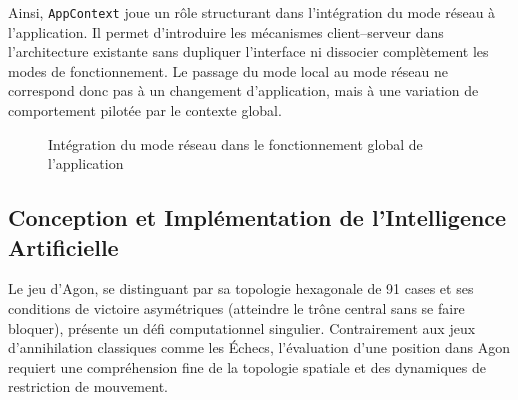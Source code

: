 \documentclass[a4paper]{article}
\begin{document}
Ainsi, \texttt{AppContext} joue un rôle structurant dans l’intégration du mode réseau à l’application. Il permet d’introduire les mécanismes client--serveur dans l’architecture existante sans dupliquer l’interface ni dissocier complètement les modes de fonctionnement. Le passage du mode local au mode réseau ne correspond donc pas à un changement d’application, mais à une variation de comportement pilotée par le contexte global.

\begin{figure}[H]
\centering
{}
\caption{Intégration du mode réseau dans le fonctionnement global de l’application}
\label{fig:integration_app}
\end{figure}


\subsection{Conception et Implémentation de l'Intelligence Artificielle}

Le jeu d'Agon, se distinguant par sa topologie hexagonale de 91 cases et ses conditions de victoire asymétriques (atteindre le trône central sans se faire bloquer), présente un défi computationnel singulier. Contrairement aux jeux d'annihilation classiques comme les Échecs, l'évaluation d'une position dans Agon requiert une compréhension fine de la topologie spatiale et des dynamiques de restriction de mouvement. 
\end{document}
